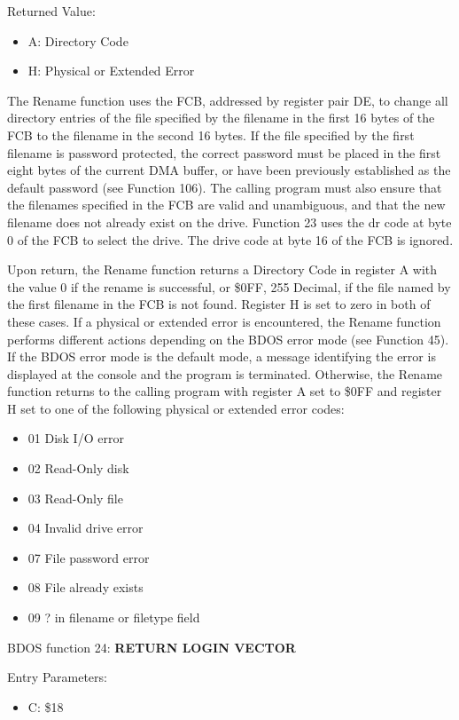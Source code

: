 Returned Value:
\begin{itemize}
\item[] A: Directory Code
\item[] H: Physical or Extended Error
\end{itemize}

The Rename function uses the FCB, addressed by register pair DE, to
change all directory entries of the file specified by the filename in
the first 16 bytes of the FCB to the filename in the second 16
bytes. If the file specified by the first filename is password
protected, the correct password must be placed in the first eight
bytes of the current DMA buffer, or have been previously established
as the default password (see Function 106). The calling program must
also ensure that the filenames specified in the FCB are valid and
unambiguous, and that the new filename does not already exist on the
drive. Function 23 uses the dr code at byte 0 of the FCB to select the
drive. The drive code at byte 16 of the FCB is ignored.

Upon return, the Rename function returns a Directory Code in register
A with the value 0 if the rename is successful, or \$0FF, 255 Decimal,
if the file named by the first filename in the FCB is not
found. Register H is set to zero in both of these cases.  If a
physical or extended error is encountered, the Rename function
performs different actions depending on the BDOS error mode (see
Function 45). If the BDOS error mode is the default mode, a message
identifying the error is displayed at the console and the program is
terminated. Otherwise, the Rename function returns to the calling
program with register A set to \$0FF and register H set to one of the
following physical or extended error codes:

\begin{itemize}
\item 01 Disk I/O error
\item 02 Read-Only disk
\item 03 Read-Only file
\item 04 Invalid drive error
\item 07 File password error
\item 08 File already exists
\item 09 ? in filename or filetype field
\end{itemize}

BDOS function 24: \textbf{RETURN LOGIN VECTOR}

Entry Parameters:
\begin{itemize}
\item[] C: \$18
\end{itemize}

